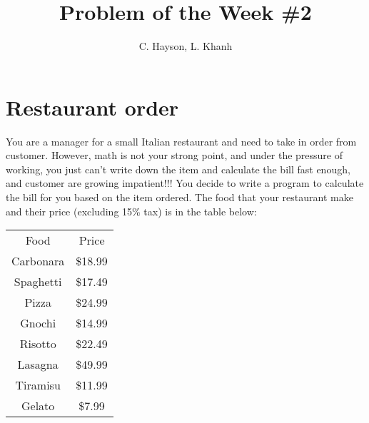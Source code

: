 \documentclass[12pt]{article}
\title{\textbf{Problem of the Week \#2}}
\author{C. Hayson, L. Khanh}
\begin{document}
\maketitle
\section*{Restaurant order}
You are a manager for a small Italian restaurant and need to take in order from customer. However, math is not your strong point, and under the pressure of working, you just can't write down the item and calculate the bill fast enough, and customer are growing impatient!!! You decide to write a program to calculate the bill for you based on the item ordered. The food that your restaurant make and their price (excluding 15\% tax) is in the table below:

\begin{table}[h!]
    \centering
    \begin{tabular}{c|c}
        Food & Price \\
        \hhline{|=|=|}
        Carbonara & \$18.99 \\
        Spaghetti & \$17.49 \\
        Pizza & \$24.99 \\
        Gnochi & \$14.99 \\
        Risotto & \$22.49 \\
        Lasagna & \$49.99 \\
        Tiramisu & \$11.99 \\
        Gelato & \$7.99
    \end{tabular}
\end{table}
\end{document}

